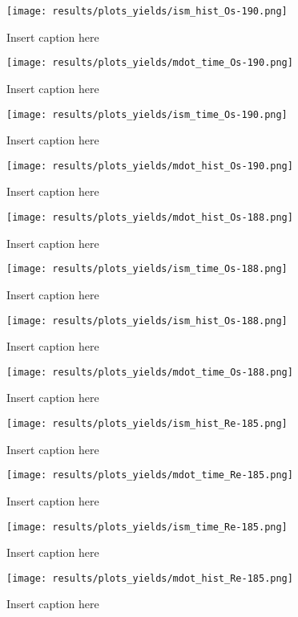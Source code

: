 \begin{figure}
  \centering
  \texttt{[image: results/plots\_yields/ism\_hist\_Os-190.png]}
  \caption{Insert caption here}
\end{figure}
\begin{figure}
  \centering
  \texttt{[image: results/plots\_yields/mdot\_time\_Os-190.png]}
  \caption{Insert caption here}
\end{figure}
\begin{figure}
  \centering
  \texttt{[image: results/plots\_yields/ism\_time\_Os-190.png]}
  \caption{Insert caption here}
\end{figure}
\begin{figure}
  \centering
  \texttt{[image: results/plots\_yields/mdot\_hist\_Os-190.png]}
  \caption{Insert caption here}
\end{figure}

\begin{figure}
  \centering
  \texttt{[image: results/plots\_yields/mdot\_hist\_Os-188.png]}
  \caption{Insert caption here}
\end{figure}
\begin{figure}
  \centering
  \texttt{[image: results/plots\_yields/ism\_time\_Os-188.png]}
  \caption{Insert caption here}
\end{figure}
\begin{figure}
  \centering
  \texttt{[image: results/plots\_yields/ism\_hist\_Os-188.png]}
  \caption{Insert caption here}
\end{figure}
\begin{figure}
  \centering
  \texttt{[image: results/plots\_yields/mdot\_time\_Os-188.png]}
  \caption{Insert caption here}
\end{figure}

\begin{figure}
  \centering
  \texttt{[image: results/plots\_yields/ism\_hist\_Re-185.png]}
  \caption{Insert caption here}
\end{figure}
\begin{figure}
  \centering
  \texttt{[image: results/plots\_yields/mdot\_time\_Re-185.png]}
  \caption{Insert caption here}
\end{figure}
\begin{figure}
  \centering
  \texttt{[image: results/plots\_yields/ism\_time\_Re-185.png]}
  \caption{Insert caption here}
\end{figure}
\begin{figure}
  \centering
  \texttt{[image: results/plots\_yields/mdot\_hist\_Re-185.png]}
  \caption{Insert caption here}
\end{figure}

